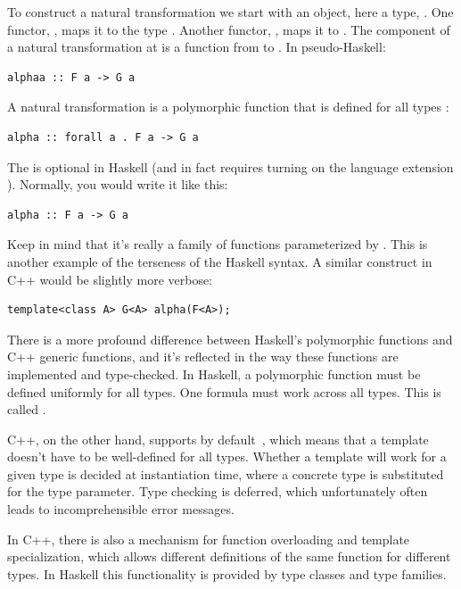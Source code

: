 To construct a natural transformation we start with an object, here a
type, . One functor, , maps it to the type
. Another functor, , maps it to .
The component of a natural transformation  at 
is a function from  to . In pseudo-Haskell:

\begin{verbatim}
alphaa :: F a -> G a
\end{verbatim}

A natural transformation is a polymorphic function that is defined for
all types :

\begin{verbatim}
alpha :: forall a . F a -> G a
\end{verbatim}

The  is optional in Haskell (and in fact requires
turning on the language extension ). Normally,
you would write it like this:

\begin{verbatim}
alpha :: F a -> G a
\end{verbatim}

Keep in mind that it's really a family of functions parameterized by
. This is another example of the terseness of the Haskell
syntax. A similar construct in C++ would be slightly more verbose:

\begin{verbatim}
template<class A> G<A> alpha(F<A>);
\end{verbatim}

There is a more profound difference between Haskell's polymorphic
functions and C++ generic functions, and it's reflected in the way these
functions are implemented and type-checked. In Haskell, a polymorphic
function must be defined uniformly for all types. One formula must work
across all types. This is called .

C++, on the other hand, supports by default~,
which means that a template doesn't have to be well-defined for all
types. Whether a template will work for a given type is decided at
instantiation time, where a concrete type is substituted for the type
parameter. Type checking is deferred, which unfortunately often leads to
incomprehensible error messages.

In C++, there is also a mechanism for function overloading and template
specialization, which allows different definitions of the same function
for different types. In Haskell this functionality is provided by type
classes and type families.

